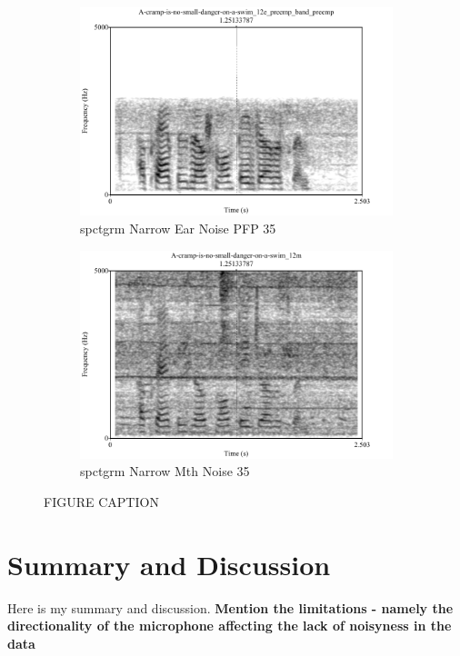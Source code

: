 \documentclass[dissertation,copyright]{uathesis}
\begin{document}
\begin{figure}
\centering
\begin{subfigure}{0.5\textwidth}
  \centering
  \includegraphics[width=1\linewidth]{figure/spctgrmNarrowEarNoisePrempFiltPremp.pdf}
  \caption{spctgrm Narrow Ear Noise PFP 35}
  \label{spctgrmNarrowEarNoisePrempFiltPremp_35}
\end{subfigure}%
\hfill
\begin{subfigure}{0.5\textwidth}
  \centering
  \includegraphics[width=1\linewidth]{figure/spctgrmNarrowMthNoise_35.pdf}
  \caption{spctgrm Narrow Mth Noise 35}
  \label{spctgrmNarrowMouthNoise_35}
\end{subfigure}
\caption{FIGURE CAPTION}
\label{fig:ear_pfp}
\end{figure}

\section{Summary and Discussion}
Here is my summary and discussion. \textbf{Mention the limitations - namely the directionality of the microphone affecting the lack of noisyness in the data}









\end{document}
